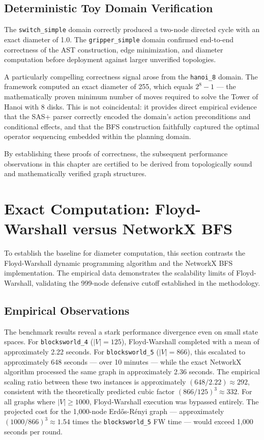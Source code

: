 \subsection{Deterministic Toy Domain Verification}

The \texttt{switch\_simple} domain correctly produced a two-node directed cycle with an exact diameter of 1.0. The \texttt{gripper\_simple} domain confirmed end-to-end correctness of the AST construction, edge minimization, and diameter computation before deployment against larger unverified topologies.

A particularly compelling correctness signal arose from the \texttt{hanoi\_8} domain. The framework computed an exact diameter of 255, which equals $2^8 - 1$ --- the mathematically proven minimum number of moves required to solve the Tower of Hanoi with 8 disks. This is not coincidental: it provides direct empirical evidence that the SAS+ parser correctly encoded the domain's action preconditions and conditional effects, and that the BFS construction faithfully captured the optimal operator sequencing embedded within the planning domain.

By establishing these proofs of correctness, the subsequent performance observations in this chapter are certified to be derived from topologically sound and mathematically verified graph structures.

\section{Exact Computation: Floyd-Warshall versus NetworkX BFS}

To establish the baseline for diameter computation, this section contrasts the Floyd-Warshall dynamic programming algorithm and the NetworkX BFS implementation. The empirical data demonstrates the scalability limits of Floyd-Warshall, validating the 999-node defensive cutoff established in the methodology.

\subsection{Empirical Observations}

The benchmark results reveal a stark performance divergence even on small state spaces. For \texttt{blocksworld\_4} ($|V| = 125$), Floyd-Warshall completed with a mean of approximately 2.22 seconds. For \texttt{blocksworld\_5} ($|V| = 866$), this escalated to approximately 648 seconds --- over 10 minutes --- while the exact NetworkX algorithm processed the same graph in approximately 2.36 seconds. The empirical scaling ratio between these two instances is approximately $(648 / 2.22) \approx 292$, consistent with the theoretically predicted cubic factor $(866 / 125)^3 \approx 332$. For all graphs where $|V| \geq 1000$, Floyd-Warshall execution was bypassed entirely. The projected cost for the 1,000-node Erdős-Rényi graph --- approximately $(1000 / 866)^3 \approx 1.54$ times the \texttt{blocksworld\_5} FW time --- would exceed 1,000 seconds per round.

